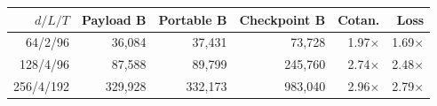 \begin{tabular}{rrrrrr}
\toprule
$d/L/T$ & Payload B & Portable B & Checkpoint B & Cotan. & Loss \\
\midrule
64/2/96 & 36,084 & 37,431 & 73,728 & 1.97$\times$ & 1.69$\times$ \\
128/4/96 & 87,588 & 89,799 & 245,760 & 2.74$\times$ & 2.48$\times$ \\
256/4/192 & 329,928 & 332,173 & 983,040 & 2.96$\times$ & 2.79$\times$ \\
\bottomrule
\end{tabular}
